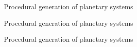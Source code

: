 \documentclass{beamer}
\begin{document}
\begin{frame}{Procedural generation of planetary systems}
\begin{center}
\noindent{}
\end{center}
\end{frame}
\begin{frame}{Procedural generation of planetary systems}
\begin{center}
\noindent{}
\end{center}
\end{frame}
\begin{frame}{Procedural generation of planetary systems}
\begin{center}
\noindent{}
\end{center}
\end{frame}
\end{document}
